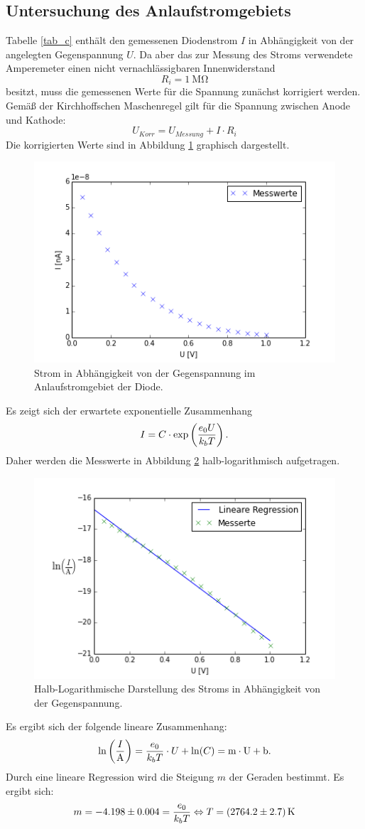 \documentclass[11pt,ngerman,a4paper]{article}
\begin{document}
\subsection{Untersuchung des Anlaufstromgebiets}
Tabelle \ref{tab_c} enthält den gemessenen Diodenstrom $I$ in Abhängigkeit von der angelegten Gegenspannung $U$. Da aber das zur Messung des Stroms verwendete Amperemeter einen nicht vernachlässigbaren Innenwiderstand
\[
R_i = \SI{1}{\mega\ohm}
\]
besitzt, muss die gemessenen Werte für die Spannung zunächst korrigiert werden. Gemäß der Kirchhoffschen Maschenregel gilt für die Spannung zwischen Anode und Kathode:
\[
U_{Korr} = U_{Messung} + I \cdot R_i
\]
Die korrigierten Werte sind in Abbildung \ref{plot_c_lin} graphisch dargestellt.
\begin{figure}[htp]
\centering
\includegraphics[scale=0.8]{plot_c_lin.png}
\caption{Strom in Abhängigkeit von der Gegenspannung im Anlaufstromgebiet der Diode.}
\label{plot_c_lin}
\end{figure}
\noindent
Es zeigt sich der erwartete exponentielle Zusammenhang
\[
I = C\cdot \exp\left(\frac{e_0 U}{k_b T}\right)\rm.
\]
Daher werden die Messwerte in Abbildung \ref{plot_c_log} halb-logarithmisch aufgetragen. 
\begin{figure}[htp]
\centering
\includegraphics[scale=0.80]{plot_c_log.png}
\caption{Halb-Logarithmische Darstellung des Stroms in Abhängigkeit von der Gegenspannung.}
\label{plot_c_log}
\end{figure}
\noindent
Es ergibt sich der folgende lineare Zusammenhang:
\[
\ln{\left(\frac{I}{\si{\ampere}}\right)} = \frac{e_0}{k_b T }\cdot U + \ln(C)\rm = m \cdot U + b.
\]
Durch eine lineare Regression wird die Steigung $m$ der Geraden bestimmt. Es ergibt sich:
\[
m = \num{-4.198+-0.004} = \frac{e_0}{k_b T} \Leftrightarrow T = \SI{2764.2+-2.7
}{\kelvin}
\] 
\end{document}
